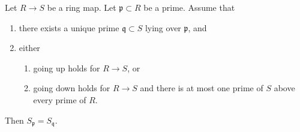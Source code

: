 \begin{lemma}
\label{editorial-source-lemma-unique-prime-over-localize-below}
Let $R \to S$ be a ring map.
Let $\mathfrak p \subset R$ be a prime.
Assume that
\begin{enumerate}
\item there exists a unique prime $\mathfrak q \subset S$ lying over
$\mathfrak p$, and
\item either
\begin{enumerate}
\item going up holds for $R \to S$, or
\item going down holds for $R \to S$ and there is at most one prime
of $S$ above every prime of $R$.
\end{enumerate}
\end{enumerate}
Then $S_{\mathfrak p} = S_{\mathfrak q}$.
\end{lemma}

